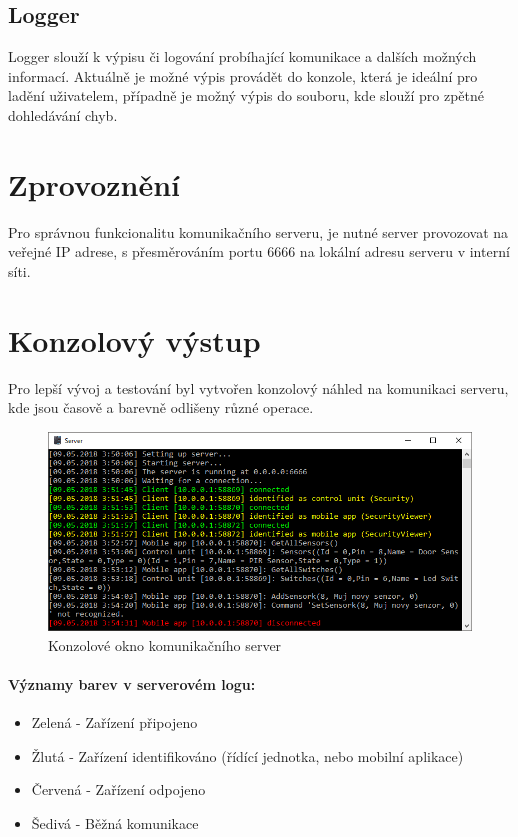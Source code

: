 \documentclass[FM,DP]{tulthesis}  %
\begin{document}
\subsection{Logger}
Logger slouží k výpisu či logování probíhající komunikace a dalších možných informací. Aktuálně je možné výpis provádět do konzole, která je ideální pro ladění uživatelem, případně je možný výpis do souboru, kde slouží pro zpětné dohledávání chyb.

\section{Zprovoznění}
Pro správnou funkcionalitu komunikačního serveru, je nutné server provozovat na veřejné IP adrese, s přesměrováním portu 6666 na lokální adresu serveru v interní síti.

\section{Konzolový výstup}
Pro lepší vývoj a testování byl vytvořen konzolový náhled na komunikaci serveru, kde jsou časově a barevně odlišeny různé operace.

\begin{figure}[H]
\begin{center}
\includegraphics[width=\textwidth]{images/serverView.png}
\caption{Konzolové okno komunikačního server}
\label{image}
\end{center}
\end{figure}

\paragraph{Významy barev v serverovém logu:}
\begin{itemize}
\item Zelená - Zařízení připojeno
\item Žlutá - Zařízení identifikováno (řídící jednotka, nebo mobilní aplikace)
\item Červená - Zařízení odpojeno
\item Šedivá - Běžná komunikace
\end{itemize}
\end{document}

